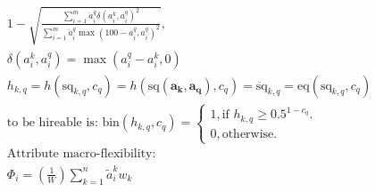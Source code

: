 \documentclass{article}
\begin{document}
\begin{gather}
    1 - 
    \sqrt{
        \frac{
            \sum_{i=1}^{m}{
                \ddot{a}_{i}^{q}
                \delta(
                    {a}_{i}^{k},
                    {a}_{i}^{q}
                ) ^ 2
            }
        }{
            \sum_{i=1}^{m}{
                \ddot{a}_{i}^{q}
                \max(
                    100 - {a}_{i}^{q}, 
                    {a}_{i}^{q}
                ) ^ 2
            }
        }
    },\\
    \delta({a}_{i}^{k}, {a}_{i}^{q}) = 
    \max({a}_{i}^{q} - {a}_{i}^{k}, 0)\\
    h_{k,q}
    = h(\text{sq}_{k,q},c_{q})
    = h(\text{sq}(\boldsymbol{a_k},\boldsymbol{a_q}),c_{q}) 
    = \ddot{\text{sq}}_{k,q}
    = \text{eq}\left(
        \text{sq}_{k,q},
        c_{q}
    \right)\\
    \text{to be hireable is: }
    \text{bin}(h_{k,q}, c_{q}) = 
    \begin{cases}
        1, \text{if } h_{k,q} \geq 0.5 ^ {1 - c_{q}}.\\
        0, \text{otherwise}.
    \end{cases}\\
    \text{Attribute macro-flexibility:}\\
    \Phi_{i} = 
    \left(\frac{1}{W}\right)
    \sum_{k=1}^{n}{
        \tilde{a}_{i}^{k}
        w_{k}
    }
\end{gather}
\end{document}
